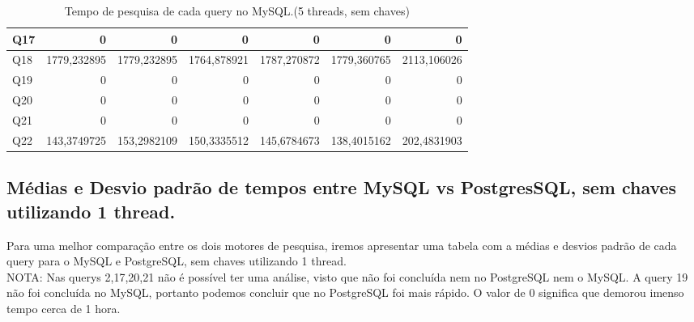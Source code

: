 \documentclass{article}
\begin{document}
\begin{table}[H]
{\begin{tabular}{|l|r|r|r|r|r|r|}
        Q17	&0&	0	&0	&0&	0&	0 \\ \hline
        Q18	&1779,232895	&1779,232895&	1764,878921&	1787,270872	&1779,360765&	2113,106026 \\ \hline
        Q19	&0&	0	&0	&0&	0&	0 \\ \hline
        Q20	&0&	0	&0	&0&	0&	0 \\ \hline
        Q21	&0&	0	&0	&0&	0&	0 \\ \hline
        Q22	&143,3749725&	153,2982109	&150,3335512	&145,6784673&	138,4015162&	202,4831903 \\ \hline \end{tabular}}
    \caption{Tempo de pesquisa de cada query no MySQL.(5 threads, sem chaves)}
    \label{tab:BC_Table3}
  \end{table}


\clearpage
\subsection{Médias e Desvio padrão de tempos entre MySQL vs PostgresSQL, sem chaves utilizando 1 thread.}

  \texttt{}\par Para uma melhor comparação entre os dois motores de pesquisa, iremos apresentar uma tabela com a médias e desvios padrão de cada query para o MySQL e PostgreSQL, sem chaves utilizando 1 thread. \\
NOTA: Nas querys 2,17,20,21 não é possível ter uma análise, visto que não foi concluída nem no PostgreSQL nem o MySQL. A query 19 não foi concluída no MySQL, portanto podemos concluir que no PostgreSQL foi mais rápido. O valor de 0 significa que demorou imenso tempo cerca de 1 hora.
\end{document}
